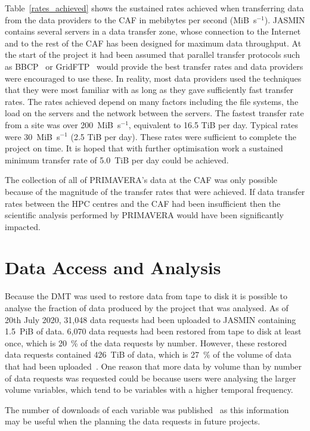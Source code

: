 \documentclass[gmd, manuscript]{copernicus}
\begin{document}
Table~\ref{rates_achieved} shows the sustained rates achieved when transferring data from the data providers to the CAF in mebibytes per second (MiB~s$^{-1}$). JASMIN contains several servers in a data transfer zone, whose connection to the Internet and to the rest of the CAF has been designed for maximum data throughput. At the start of the project it had been assumed that parallel transfer protocols such as BBCP~\citep{bbcp} or GridFTP~\citep{Foster}\citep{Globus} would provide the best transfer rates and data providers were encouraged to use these. In reality, most data providers used the techniques that they were most familiar with as long as they gave sufficiently fast transfer rates. The rates achieved depend on many factors including the file systems, the load on the servers and the network between the servers. The fastest transfer rate from a site was over 200~MiB~s$^{-1}$, equivalent to 16.5 TiB per day. Typical rates were 30~MiB~s$^{-1}$ (2.5 TiB per day). These rates were sufficient to complete the project on time. It is hoped that with further optimisation work a sustained minimum transfer rate of 5.0~TiB per day could be achieved.

The collection of all of PRIMAVERA's data at the CAF was only possible because of the magnitude of the transfer rates that were achieved. If data transfer rates between the HPC centres and the CAF had been insufficient then the scientific analysis performed by PRIMAVERA would have been significantly impacted.

\section{Data Access and Analysis}

Because the DMT was used to restore data from tape to disk it is possible to analyse the fraction of data produced by the project that was analysed. As of 20th July 2020, 31,048 data requests had been uploaded to JASMIN containing 1.5~PiB of data. 6,070 data requests had been restored from tape to disk at least once, which is 20~\% of the data requests by number. However, these restored data requests contained 426~TiB of data, which is 27~\% of the volume of data that had been uploaded~\citep{Seddon2020b}. One reason that more data by volume than by number of data requests was requested could be because users were analysing the larger volume variables, which tend to be variables with a higher temporal frequency. 

The number of downloads of each variable was published~\citep{Seddon2020c} as this information may be useful when the planning the data requests in future projects.
\end{document}
